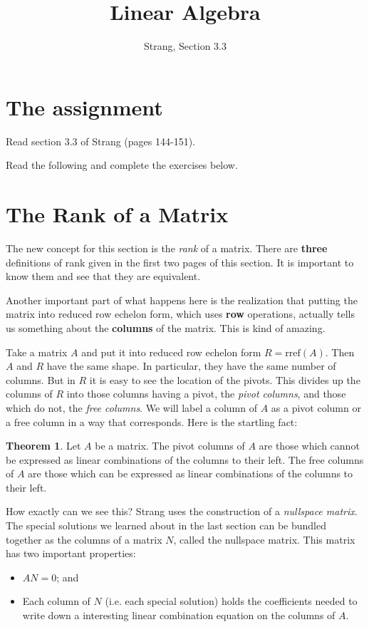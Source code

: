 \documentclass[11pt]{amsart}
\theoremstyle{definition}
\newtheorem*{theorem}{Theorem}
\begin{document}
\title{Linear Algebra}
\author{Strang, Section 3.3}
\maketitle

\section{The assignment}
\begin{compactitem}
\item Read section 3.3 of Strang (pages 144-151).
\item Read the following and complete the exercises below.
\end{compactitem}


\section{The Rank of a Matrix}

The new concept for this section is the \emph{rank} of a matrix. There are \textbf{three} definitions of rank given in the first two pages of this section. It is important to know them and see that they are equivalent.

Another important part of what happens here is the realization that putting the matrix into reduced row echelon form, which uses \textbf{row} operations, actually tells us something about the \textbf{columns} of the matrix. This is kind of amazing.

Take a matrix $A$ and put it into reduced row echelon form $R = \mathrm{rref}(A)$. Then $A$ and $R$ have the same shape. In particular, they have the same number of columns. But in $R$ it is easy to see the location of the pivots. This divides up the columns of $R$ into those columns having a pivot, the \emph{pivot columns}, and those which do not, the \emph{free columns}.
We will label a column of $A$ as a pivot column or a free column in a way that corresponds.
Here is the startling fact:

\begin{theorem}
Let $A$ be a matrix.
The pivot columns of $A$ are those which cannot be expressed as linear combinations of the columns to their left.
The free columns of $A$ are those which can be expressed as linear combinations of the columns to their left.
\end{theorem}

How exactly can we see this? Strang uses the construction of a \emph{nullspace matrix}. The special solutions we learned about in the last section can be bundled together as the columns of a matrix $N$, called the nullspace matrix. This matrix has two important properties:
\begin{itemize}
\item $AN = 0$; and
\item Each column of $N$ (i.e. each special solution) holds the coefficients needed to write down a interesting linear combination equation on the columns of $A$.
\end{itemize}
\end{document}
